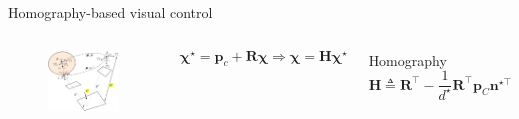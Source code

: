 \documentclass{beamer}
\begin{document}
\begin{frame}{Homography-based visual control}
\begin{columns}
	\begin{figure}
		\includegraphics[width = 63mm]{Images/Notation_rot_modif3.png}
	\end{figure}\vspace{-0.5cm}
	$$\mathbf{\chi}^\star = \mathbf{p}_c + \mathbf{R}\mathbf{\chi} \Rightarrow \mathbf{\chi} = \mathbf{H}\mathbf{\chi}^\star$$ \vspace{-0.8cm}	
	
	\pause
	\begin{block}{Homography}
		\vspace{-0.3cm}
		\begin{equation*}
		\mathbf{H} \triangleq \mathbf{R}^{\!\top} - \frac{1}{d^\star} \mathbf{R}^{\!\top} \mathbf{p}_C \mathbf{n}^{\star\!\top} 
		\end{equation*}
		\centering
	\end{block}	
	
\end{columns}
\end{frame}
\end{document}
